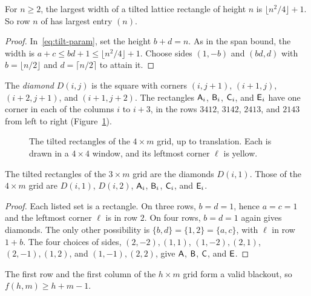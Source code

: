 \begin{corollary}\label{cor:oeisconj}
For $n\ge2$, the largest width of a tilted lattice rectangle of height $n$ is $\lfloor n^2/4\rfloor+1$. So row $n$ of  has largest entry $(n)$.
\end{corollary}

\begin{proof}
In~\eqref{eq:tilt-param}, set the height $b+d=n$. As in the span bound,
the width is $a+c\le bd+1\le\lfloor n^2/4\rfloor+1$.
Choose sides $(1,-b)$ and $(bd,d)$ with $b=\lfloor n/2\rfloor$ and
$d=\lceil n/2\rceil$ to attain it.
\end{proof}

The \emph{diamond} $D(i,j)$ is the square with corners $(i,j+1)$, $(i+1,j)$, $(i+2,j+1)$, and $(i+1,j+2)$. The rectangles $\mathsf{A}_i$, $\mathsf{B}_i$, $\mathsf{C}_i$, and $\mathsf{E}_i$ have one corner in each of the columns $i$ to $i+3$, in the rows $3412$, $3142$, $2413$, and $2143$ from left to right (Figure~\ref{fig:tilted}).

\begin{figure}[t]
\centering

\caption{The tilted rectangles of the $4\times m$ grid, up to translation. Each is drawn in a $4\times4$ window, and its leftmost corner $\ell$ is yellow.}
\label{fig:tilted}
\end{figure}

\begin{lemma}\label{lem:tilted-narrow}
The tilted rectangles of the $3\times m$ grid are the diamonds $D(i,1)$. Those of the $4\times m$ grid are $D(i,1)$, $D(i,2)$, $\mathsf{A}_i$, $\mathsf{B}_i$, $\mathsf{C}_i$, and $\mathsf{E}_i$.
\end{lemma}

\begin{proof}
Each listed set is a rectangle. On three rows,
$b=d=1$, hence $a=c=1$ and the leftmost corner $\ell$ is in row $2$.
On four rows, $b=d=1$ again gives diamonds. The only other possibility
is $\{b,d\}=\{1,2\}=\{a,c\}$, with $\ell$ in row $1+b$.
The four choices of sides, $(2,-2),(1,1)$, $(1,-2),(2,1)$,
$(2,-1),(1,2)$, and $(1,-1),(2,2)$, give $\mathsf{A}$, $\mathsf{B}$, $\mathsf{C}$, and $\mathsf{E}$.
\end{proof}

\begin{lemma}\label{lem:cross}
The first row and the first column of the $h\times m$ grid form a valid blackout, so $f(h,m)\ge h+m-1$.
\end{lemma}

